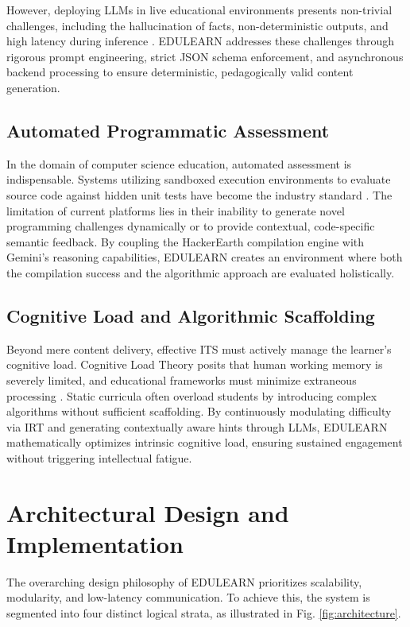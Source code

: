 \documentclass[conference]{IEEEtran}
\begin{document}
However, deploying LLMs in live educational environments presents non-trivial challenges, including the hallucination of facts, non-deterministic outputs, and high latency during inference \cite{kasneci2023chatgpt}. EDULEARN addresses these challenges through rigorous prompt engineering, strict JSON schema enforcement, and asynchronous backend processing to ensure deterministic, pedagogically valid content generation.

\subsection{Automated Programmatic Assessment}
In the domain of computer science education, automated assessment is indispensable. Systems utilizing sandboxed execution environments to evaluate source code against hidden unit tests have become the industry standard \cite{ihantola2010review}. The limitation of current platforms lies in their inability to generate novel programming challenges dynamically or to provide contextual, code-specific semantic feedback. By coupling the HackerEarth compilation engine with Gemini's reasoning capabilities, EDULEARN creates an environment where both the compilation success and the algorithmic approach are evaluated holistically.

\subsection{Cognitive Load and Algorithmic Scaffolding}
Beyond mere content delivery, effective ITS must actively manage the learner's cognitive load. Cognitive Load Theory posits that human working memory is severely limited, and educational frameworks must minimize extraneous processing \cite{baker2014educational}. Static curricula often overload students by introducing complex algorithms without sufficient scaffolding. By continuously modulating difficulty via IRT and generating contextually aware hints through LLMs, EDULEARN mathematically optimizes intrinsic cognitive load, ensuring sustained engagement without triggering intellectual fatigue.

\section{Architectural Design and Implementation}

The overarching design philosophy of EDULEARN prioritizes scalability, modularity, and low-latency communication. To achieve this, the system is segmented into four distinct logical strata, as illustrated in Fig. \ref{fig:architecture}.
\end{document}
